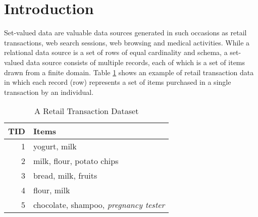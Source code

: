 \section{Introduction}
\label{sec:intro}
%
%
%
%
%
%

Set-valued data are valuable data sources generated in
such occasions as retail transactions, web search sessions, 
web browsing and medical activities. 
While a relational data source is
a set of rows of equal cardinality and schema,
a set-valued data source consists of multiple records, each of which is
a set of items drawn from a finite domain. Table \ref{tab:retail-ex} shows
an example of retail transaction data in which each record (row) represents
a set of items purchased in a single transaction by an individual.

\begin{table}[th]
\centering
\caption{A Retail Transaction Dataset}\label{tab:retail-ex}

\begin{tabular}{|r|l|} \hline
{\bf TID} & {\bf Items} \\ \hline \hline
1 & yogurt, milk \\ \hline
2 & milk, flour, potato chips \\ \hline
3 & bread, milk, fruits \\ \hline
4 & flour, milk \\ \hline
5 & chocolate, shampoo, {\em pregnancy tester} \\ \hline
\end{tabular}
\end{table}

